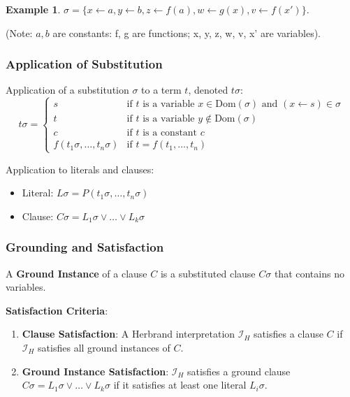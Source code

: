\documentclass[11pt,a4paper]{article}
\theoremstyle{definition}
\newtheorem{example}{Example}[section]
\theoremstyle{plain}
\theoremstyle{remark}
\begin{document}
\begin{example}

$\sigma = \{ x \leftarrow a, y \leftarrow b, z \leftarrow f(a), w \leftarrow g(x), v \leftarrow f(x') \}$.

(Note: $a, b$ are constants: f, g are functions; x, y, z, w, v, x' are variables).

\end{example}



\subsubsection{Application of Substitution}

Application of a substitution $\sigma$ to a term $t$, denoted $t\sigma$:
\[
t\sigma = \begin{cases}
    s & \text{if } t \text{ is a variable } x \in \text{Dom}(\sigma) \text{ and } (x \leftarrow s) \in \sigma \\
    t & \text{if } t \text{ is a variable } y \notin \text{Dom}(\sigma) \\
    c & \text{if } t \text{ is a constant } c \\
    f(t_1\sigma, \dots, t_n\sigma) & \text{if } t = f(t_1, \dots, t_n)
\end{cases}
\]

Application to literals and clauses:
\begin{itemize}
    \item Literal: $L\sigma = P(t_1\sigma, \dots, t_n\sigma)$
    \item Clause: $C\sigma = L_1\sigma \lor \dots \lor L_k\sigma$
\end{itemize}



\subsubsection{Grounding and Satisfaction}

A \textbf{Ground Instance} of a clause $C$ is a substituted clause $C\sigma$ that contains no variables.



\textbf{Satisfaction Criteria}:

\begin{enumerate}

    \item \textbf{Clause Satisfaction}: A Herbrand interpretation $\mathcal{I}_H$ satisfies a clause $C$ if $\mathcal{I}_H$ satisfies all ground instances of $C$.

    \item \textbf{Ground Instance Satisfaction}: $\mathcal{I}_H$ satisfies a ground clause $C\sigma = L_1\sigma \lor \dots \lor L_k\sigma$ if it satisfies at least one literal $L_i\sigma$.

\end{enumerate}
\end{document}
